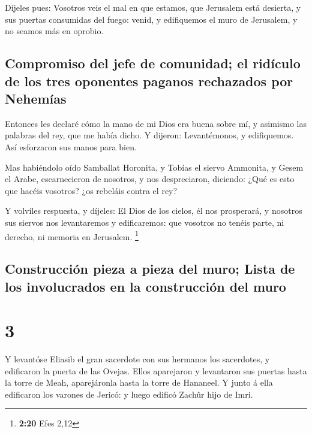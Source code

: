  Díjeles pues: Vosotros veis el mal en que estamos, que
Jerusalem está desierta, y sus puertas consumidas del fuego: venid, y
edifiquemos el muro de Jerusalem, y no seamos más en oprobio.

\hypertarget{compromiso-del-jefe-de-comunidad-el-riduxedculo-de-los-tres-oponentes-paganos-rechazados-por-nehemuxedas}{%
\subsection{Compromiso del jefe de comunidad; el ridículo de los tres
oponentes paganos rechazados por
Nehemías}\label{compromiso-del-jefe-de-comunidad-el-riduxedculo-de-los-tres-oponentes-paganos-rechazados-por-nehemuxedas}}

 Entonces les declaré cómo la mano de mi Dios era buena
sobre mí, y asimismo las palabras del rey, que me había dicho. Y
dijeron: Levantémonos, y edifiquemos. Así esforzaron sus manos para
bien.

 Mas habiéndolo oído Samballat Horonita, y Tobías el siervo
Ammonita, y Gesem el Arabe, escarnecieron de nosotros, y nos
despreciaron, diciendo: ¿Qué es esto que hacéis vosotros? ¿os rebeláis
contra el rey?

 Y volvíles respuesta, y díjeles: El Dios de los cielos, él
nos prosperará, y nosotros sus siervos nos levantaremos y edificaremos:
que vosotros no tenéis parte, ni derecho, ni memoria en Jerusalem.
\footnote{\textbf{2:20} Efes 2,12}

\hypertarget{construcciuxf3n-pieza-a-pieza-del-muro-lista-de-los-involucrados-en-la-construcciuxf3n-del-muro}{%
\subsection{Construcción pieza a pieza del muro; Lista de los
involucrados en la construcción del
muro}\label{construcciuxf3n-pieza-a-pieza-del-muro-lista-de-los-involucrados-en-la-construcciuxf3n-del-muro}}

\hypertarget{section-2}{%
\section{3}\label{section-2}}

 Y levantóse Eliasib el gran sacerdote con sus hermanos los
sacerdotes, y edificaron la puerta de las Ovejas. Ellos aparejaron y
levantaron sus puertas hasta la torre de Meah, aparejáronla hasta la
torre de Hananeel.  Y junto á ella edificaron los varones de
Jericó: y luego edificó Zachûr hijo de Imri.

